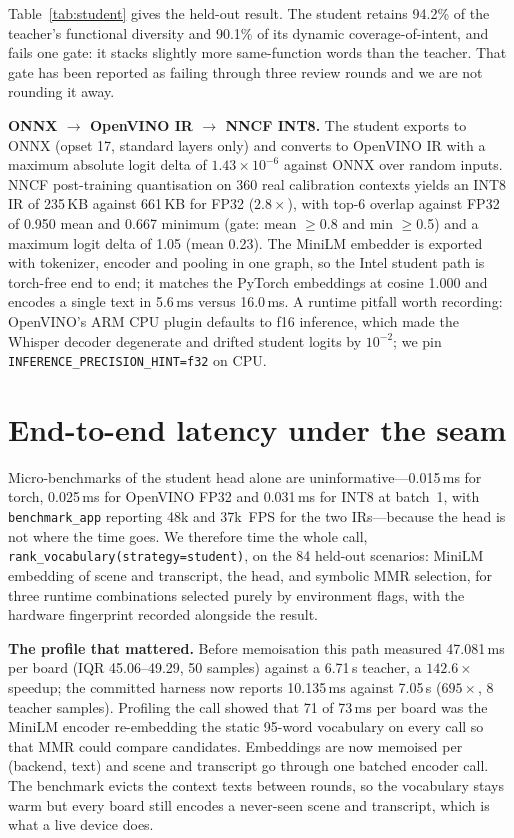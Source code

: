 \documentclass{article}
\newcommand{\fn}[1]{\texttt{#1}}
\begin{document}
Table~\ref{tab:student} gives the held-out result. The student retains 94.2\% of
the teacher's functional diversity and 90.1\% of its dynamic coverage-of-intent,
and fails one gate: it stacks slightly more same-function words than the
teacher. That gate has been reported as failing through three review rounds and
we are not rounding it away.

\textbf{ONNX $\rightarrow$ OpenVINO IR $\rightarrow$ NNCF INT8.} The student
exports to ONNX (opset 17, standard layers only) and converts to OpenVINO IR \citep{openvino}
with a maximum absolute logit delta of $1.43\times10^{-6}$ against ONNX over
random inputs. NNCF post-training quantisation on 360 real calibration contexts
yields an INT8 IR of 235\,KB against 661\,KB for FP32 ($2.8\times$), with top-6
overlap against FP32 of 0.950 mean and 0.667 minimum (gate: mean $\ge$0.8 and
min $\ge$0.5) and a maximum logit delta of 1.05 (mean 0.23). The MiniLM embedder
is exported with tokenizer, encoder and pooling in one graph, so the Intel
student path is torch-free end to end; it matches the PyTorch embeddings at
cosine 1.000 and encodes a single text in 5.6\,ms versus 16.0\,ms. A runtime
pitfall worth recording: OpenVINO's ARM CPU plugin defaults to f16 inference,
which made the Whisper decoder degenerate and drifted student logits by
$10^{-2}$; we pin \fn{INFERENCE\_PRECISION\_HINT=f32} on CPU.

\section{End-to-end latency under the seam}\label{sec:latency}

Micro-benchmarks of the student head alone are uninformative---0.015\,ms for
torch, 0.025\,ms for OpenVINO FP32 and 0.031\,ms for INT8 at batch~1, with
\fn{benchmark\_app} reporting 48k and 37k~FPS for the two IRs---because the
head is not where the time goes. We therefore time the whole call,
\fn{rank\_vocabulary(strategy=student)}, on the 84 held-out scenarios: MiniLM
embedding of scene and transcript, the head, and symbolic MMR selection, for
three runtime combinations selected purely by environment flags, with the
hardware fingerprint recorded alongside the result.

\textbf{The profile that mattered.} Before memoisation this path measured
47.081\,ms per board (IQR 45.06--49.29, 50 samples) against a 6.71\,s teacher, a
$142.6\times$ speedup; the committed harness now reports 10.135\,ms against
7.05\,s ($695\times$, 8 teacher samples). Profiling the call showed that 71 of
73\,ms per board was the MiniLM encoder re-embedding the static 95-word
vocabulary on every call so that MMR could compare candidates. Embeddings are
now memoised per (backend, text) and scene and transcript go through one batched
encoder call. The benchmark evicts the context texts between rounds, so the
vocabulary stays warm but every board still encodes a never-seen scene and
transcript, which is what a live device does.
\end{document}
